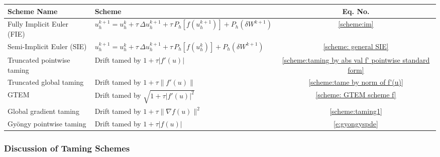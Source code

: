 \documentclass[reqno, 11pt]{amsart}
\theoremstyle{plain}
\theoremstyle{definition}
\theoremstyle{remark}
\numberwithin{equation}{section}
\numberwithin{theorem}{section}
\begin{document}
{\begin{table}[ht]

\begin{tabular}{|l|l|c|}
\hline
\textbf{Scheme Name} & \textbf{Scheme} & \textbf{Eq. No.} \\
\hline
Fully Implicit Euler (FIE) & $
u_h^{k+1} = u_h^{k} + \tau \,\Delta u_h^{k+1} +
\tau \,P_h [f(u_h^{k+1})] + P_h (\delta W^{k+1})
$ & \eqref{scheme:im} \\
Semi-Implicit Euler (SIE) & $
u_h^{k+1} = u_h^{k} + \tau \,\Delta u_h^{k+1} +
\tau \,P_h [f(u_h^{k})] + P_h (\delta W^{k+1})
$ & \eqref{scheme: general SIE} \\
Truncated pointwise taming & Drift tamed by $1+\tau |f'(u)|$ & \eqref{scheme:taming by abs val f' pointwise standard form} \\
Truncated global taming & Drift tamed by $1+\tau \|f'(u)\|$ & \eqref{scheme:tame by norm of f'(u)} \\
GTEM & Drift tamed by $\sqrt{1+\tau |f'(u)|^2}$ & \eqref{scheme: GTEM scheme f} \\
Global gradient taming & Drift tamed by $1+\tau \|\nabla f(u)\|^2$ & \eqref{scheme:taming1} \\
Gy\"ongy pointwise taming & Drift tamed by $1+\tau|f(u)|$ & \eqref{e:gyongyspde} \\
\hline
\end{tabular}
\end{table}



\subsubsection{Discussion of Taming Schemes}\label{subsec: discussion of taming schemes}


}
\end{document}
